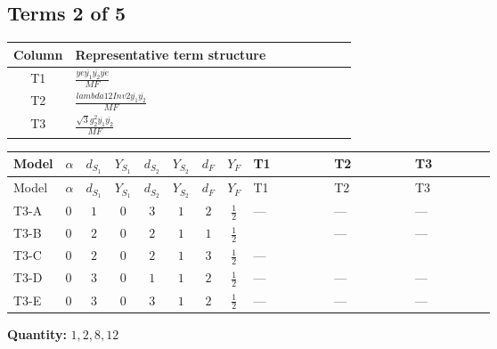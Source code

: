\documentclass[8pt]{article}
\begin{document}
\begin{landscape}
\subsection*{Terms 2 of 5}
\begin{center}
\begin{tabular}{@{}c >{\raggedright\arraybackslash}p{0.82\linewidth}@{}}
\toprule
Column & Representative term structure \\
\midrule
T1 & \(\displaystyle \frac{ye \overline{y_{1}} \overline{y_{2}} \overline{ye}}{MF}\) \\
\midrule
T2 & \(\displaystyle \frac{lambda12Inv2 \overline{y_{1}} \overline{y_{2}}}{MF}\) \\
\midrule
T3 & \(\displaystyle \frac{\sqrt{3} g_{2}^{2} \overline{y_{1}} \overline{y_{2}}}{MF}\) \\
\midrule
\bottomrule
\end{tabular}
\end{center}
\smallskip
\tiny
\begin{longtable}{@{}llcccccc >{\raggedright\arraybackslash}p{0.21\linewidth} >{\raggedright\arraybackslash}p{0.21\linewidth} >{\raggedright\arraybackslash}p{0.21\linewidth}@{}}
\toprule
Model & $\alpha$ & $d_{S_1}$ & $Y_{S_1}$ & $d_{S_2}$ & $Y_{S_2}$ & $d_F$ & $Y_F$ & T1 & T2 & T3 \\
\midrule
\endfirsthead
\toprule
Model & $\alpha$ & $d_{S_1}$ & $Y_{S_1}$ & $d_{S_2}$ & $Y_{S_2}$ & $d_F$ & $Y_F$ & T1 & T2 & T3 \\
\midrule
\endhead
T3-A & $0$ & $1$ & $0$ & $3$ & $1$ & $2$ & $\frac{1}{2}$ & --- & --- & --- \\
\midrule
T3-B & $0$ & $2$ & $0$ & $2$ & $1$ & $1$ & $\frac{1}{2}$ & \scriptsize\adjustbox{max width=\linewidth}{$\begin{gathered} \frac{ye \overline{y_{1}} \overline{y_{2}} \overline{ye}}{8 MF}\end{gathered}$} & --- & --- \\
\midrule
T3-C & $0$ & $2$ & $0$ & $2$ & $1$ & $3$ & $\frac{1}{2}$ & --- & \scriptsize\adjustbox{max width=\linewidth}{$\begin{gathered} \frac{lambda12Inv2 \overline{y_{1}} \overline{y_{2}}}{6 MF}\end{gathered}$} & \scriptsize\adjustbox{max width=\linewidth}{$\begin{gathered} \frac{\sqrt{3} g_{2}^{2} \overline{y_{1}} \overline{y_{2}}}{8 MF}\end{gathered}$} \\
\midrule
T3-D & $0$ & $3$ & $0$ & $1$ & $1$ & $2$ & $\frac{1}{2}$ & --- & --- & --- \\
\midrule
T3-E & $0$ & $3$ & $0$ & $3$ & $1$ & $2$ & $\frac{1}{2}$ & --- & --- & --- \\
\midrule
\bottomrule
\end{longtable}
\clearpage
\noindent\textbf{Quantity: }$\mathrm{1,2,8,12}$\par\smallskip

\end{landscape}
\end{document}
